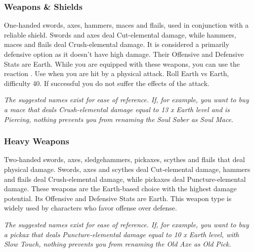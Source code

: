 \begin{tabwpn}[label=inv-lsword,range=melee,type=physical,element=puncture,roll=airvair]
    
\end{tabwpn}
\clearpage

\subsubsection{Weapons \& Shields}

One-handed swords, axes, hammers, maces and flails, used in conjunction with a reliable shield. Swords and axes deal Cut-elemental damage, while hammers, maces and flails deal Crush-elemental damage. It is considered a primarily defensive option as it doesn’t have high damage. Their Offensive and Defensive Stats are Earth. While you are equipped with these weapons, you can use the reaction . Use when you are hit by a physical attack. Roll Earth vs Earth, difficulty 40. If successful you do not suffer the effects of the attack.

\begin{tabwpn}[label=inv-hwpnshld,range=melee,type=physical,element=crush / cut,roll=earthvearth]
    
\end{tabwpn}
{\footnotesize\textit{The suggested names exist for ease of reference. If, for example, you want to buy a mace that deals Crush-elemental damage equal to 13 x Earth level and is Piercing, nothing prevents you from renaming the Soul Saber as Soul Mace.}}
\clearpage

\subsubsection{Heavy Weapons}

Two-handed swords, axes, sledgehammers, pickaxes, scythes and flails that deal physical damage. Swords, axes and scythes deal Cut-elemental damage, hammers and flails deal Crush-elemental damage, while pickaxes deal Puncture-elemental damage. These weapons are the Earth-based choice with the highest damage potential. Its Offensive and Defensive Stats are Earth. This weapon type is widely used by characters who favor offense over defense.

\begin{tabwpn}[label=inv-hwpn,range=melee,type=physical,element=crush / cut / puncture,roll=earthvearth]
    
\end{tabwpn}
{\footnotesize\textit{The suggested names exist for ease of reference. If, for example, you want to buy a pickax that deals Puncture-elemental damage equal to 10 x Earth level, with Slow Touch, nothing prevents you from renaming the Old Axe as Old Pick.}}
\clearpage

